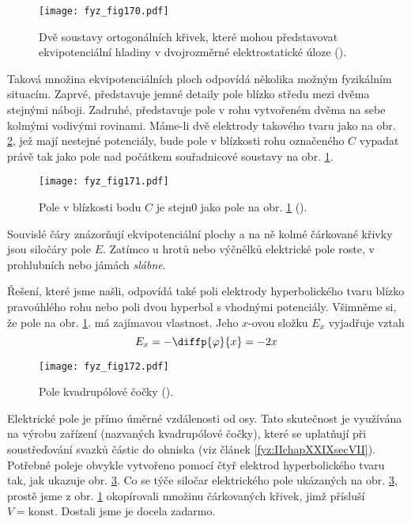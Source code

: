   \begin{figure}[ht!]  %
    \centering
    \texttt{[image: fyz\_fig170.pdf]}
    \caption{Dvě soustavy ortogonálních křivek, které mohou představovat ekvipotenciální hladiny v 
             dvojrozměrné elektrostatické úloze 
             (\cite[s.~126]{Feynman02}).}
    \label{fyz:fig170}
  \end{figure}

  Taková množina ekvipotenciálních ploch odpovídá několika možným fyzikálním situacím. Zaprvé,
  představuje jemné detaily pole blízko středu mezi dvěma stejnými náboji. Zadruhé, představuje pole
  v rohu vytvořeném dvěma na sebe kolmými vodivými rovinami. Máme-li dvě elektrody takového tvaru
  jako na obr. \ref{fyz:fig171}, jež mají nestejné potenciály, bude pole v blízkosti rohu označeného
  \(C\) vypadat právě tak jako pole nad počátkem souřadnicové soustavy na obr. \ref{fyz:fig170}.

  \begin{figure}[ht!]  %
    \centering
    \texttt{[image: fyz\_fig171.pdf]}
    \caption{Pole v blízkosti bodu \(C\) je stejn0 jako pole na obr. \ref{fyz:fig170}
             (\cite[s.~127]{Feynman02}).}
    \label{fyz:fig171}
  \end{figure}

  Souvislé čáry znázorňují ekvipotenciální plochy a na ně kolmé čárkované křivky jsou siločáry pole
  \(E\). Zatímco u hrotů nebo výčnělků elektrické pole roste, v prohlubních nebo jámách
  \emph{slábne}.

  Řešení, které jsme našli, odpovídá také poli elektrody hyperbolického tvaru blízko pravoúhlého
  rohu nebo poli dvou hyperbol s vhodnými potenciály. Všimněme si, že pole na obr. \ref{fyz:fig170}.
  má zajímavou vlastnost. Jeho \(x\)-ovou složku \(E_x\) vyjadřuje vztah
  \begin{equation*}
    E_x = - \diffp{\varphi}{x} = -2x
  \end{equation*}

  \begin{figure}[ht!]  %
    \centering
    \texttt{[image: fyz\_fig172.pdf]}
    \caption{Pole kvadrupólové čočky (\cite[s.~127]{Feynman02}).}
    \label{fyz:fig172}
  \end{figure}

  Elektrické pole je přímo úměrné vzdálenosti od osy. Tato skutečnost je využívána na výrobu
  zařízení (nazvaných kvadrupólové čočky), které se uplatňují při soustřeďování svazků částic do
  ohniska (viz článek \ref{fyz:IIchapXXIXsecVII}). Potřebné poleje obvykle vytvořeno pomocí čtyř
  elektrod hyperbolického tvaru tak, jak ukazuje obr. \ref{fyz:fig172}. Co se týče siločar
  elektrického pole ukázaných na obr. \ref{fyz:fig172}, prostě jsme z obr. \ref{fyz:fig170}
  okopírovali množinu čárkovaných křivek, jimž přísluší \(V=\text{konst}\). Dostali jsme je docela
  zadarmo.

